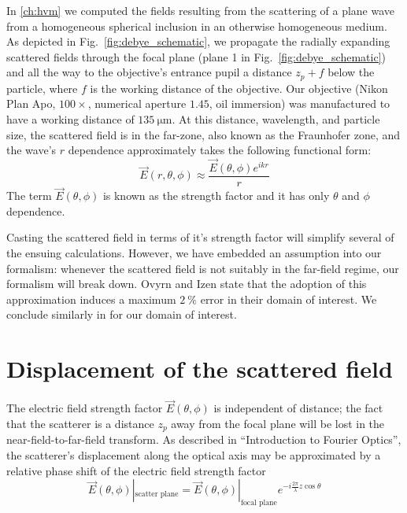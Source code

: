 In \autoref{ch:hvm} we computed the fields resulting from the scattering of
a plane wave from a homogeneous spherical inclusion in an otherwise
homogeneous medium. As depicted in Fig.~\ref{fig:debye_schematic}, we
propagate the radially expanding scattered fields through the focal plane (plane \num{1} in
Fig.~\ref{fig:debye_schematic}) and all the way to the objective's entrance pupil a distance
$z_p + f$ below the particle, where $f$ is the working distance of the objective.
Our objective  (Nikon Plan Apo, $\num{100}\times$, numerical aperture $\num{1.45}$,
oil immersion) was manufactured to have a working distance of $\SI{135}{\um}$.
At this distance, wavelength, and particle size, the scattered field is in the far-zone,
also known as the Fraunhofer zone, and the wave's $r$ dependence approximately
takes the following functional form:
\begin{equation*}
  \label{eq:strength_factor}
  \vec{E}(r, \theta, \phi) \approx \frac{\vec{E}(\theta, \phi)e^{ikr}}{r}
\end{equation*}
The term $\vec{E}(\theta, \phi)$ is known as the strength factor and it
has only $\theta$ and $\phi$ dependence. 

Casting the scattered field in terms of it's strength factor will simplify
several of the ensuing calculations. However, we have embedded an assumption
into our formalism: whenever the scattered field is not suitably in the far-field
regime, our formalism will break down. Ovyrn and Izen\cite{izen00} state
that the adoption of this approximation induces a maximum
$\SI{2}{\percent}$ error in their domain of interest. We conclude similarly in
\cite{app:lorenzmie_approx} for our domain of interest.

\section{ Displacement of the scattered field}

The electric field strength factor $\vec{E}(\theta, \phi)$ is independent
of distance; the fact that the scatterer is a distance $z_p$ away
from the focal plane will be lost in the near-field-to-far-field transform.
As described in  ``Introduction to Fourier Optics''\cite{goodman05},
the scatterer's displacement along the optical axis may be approximated by
a relative phase shift of the electric field strength factor
\begin{equation*}
  \label{eq:entrance_pupil}
    \vec{E}(\theta, \phi)|_{\text{scatter plane}} = \vec{E}(\theta, \phi)|_{\text{focal plane}} e^{-i\frac{2\pi}{\lambda}z\cos{\theta} }
  \end{equation*}
  
